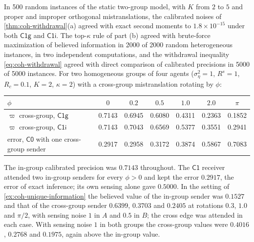\begin{numcheck}\label{chk:coh-withdrawal}
In 500 random instances of the static two-group model, with $K$ from $2$ to $5$ and proper and improper orthogonal mistranslations, the calibrated noises of \cref{thm:coh-withdrawal}(a) agreed with exact second moments to $1.8\times10^{-15}$ under both $\mathsf{C1g}$ and $\mathsf{C1i}$. The top-$\kappa$ rule of part (b) agreed with brute-force maximization of believed information in 2000 of 2000 random heterogeneous instances, in two independent computations, and the withdrawal inequality \eqref{eq:coh-withdrawal} agreed with direct comparison of calibrated precisions in 5000 of 5000 instances. For two homogeneous groups of four agents ($\sigma_\eta^2=1$, $R^s=1$, $R_c=0.1$, $K=2$, $\kappa=2$) with a cross-group mistranslation rotating by $\phi$:
\begin{center}
\begin{tabular}{@{}lcccccc@{}}
\toprule
$\phi$ & $0$ & $0.2$ & $0.5$ & $1.0$ & $2.0$ & $\pi$ \\
\midrule
$\varpi$ cross-group, $\mathsf{C1g}$ & 0.7143 & 0.6945 & 0.6080 & 0.4311 & 0.2363 & 0.1852 \\
$\varpi$ cross-group, $\mathsf{C1i}$ & 0.7143 & 0.7043 & 0.6569 & 0.5377 & 0.3551 & 0.2941 \\
error, $\mathsf{C0}$ with one cross-group sender & 0.2917 & 0.2958 & 0.3172 & 0.3874 & 0.5867 & 0.7083 \\
\bottomrule
\end{tabular}
\end{center}
The in-group calibrated precision was $0.7143$ throughout. The $\mathsf{C1}$ receiver attended two in-group senders for every $\phi>0$ and kept the error $0.2917$, the error of exact inference; its own sensing alone gave $0.5000$. In the setting of \cref{ex:coh-unique-information} the believed value of the in-group sender was $0.1527$ and that of the cross-group sender $0.6399$, $0.3703$ and $0.2405$ at rotations $0.3$, $1.0$ and $\pi/2$, with sensing noise $1$ in $A$ and $0.5$ in $B$; the cross edge was attended in each case. With sensing noise $1$ in both groups the cross-group values were $0.4016$, $0.2768$ and $0.1975$, again above the in-group value.
\end{numcheck}

